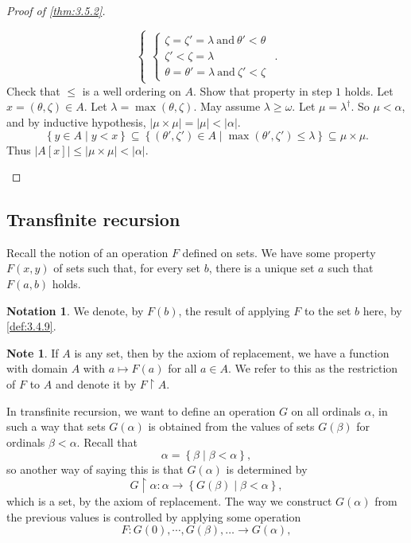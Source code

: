 \documentclass{article}
\newcommand{\rb}[1]{\left( #1 \right)}
\renewcommand{\sb}[1]{\left[ #1 \right]}
\newcommand{\cb}[1]{\left\{ #1 \right\}}
\newcommand{\abs}[1]{\left\lvert #1 \right\rvert}
\theoremstyle{definition}\newtheorem{definition}{Definition}[subsection]
\theoremstyle{definition}\newtheorem{remark1}[definition]{Remark}
\theoremstyle{definition}\newtheorem{example1}[definition]{Example}
\theoremstyle{definition}\newtheorem*{remark2}{Remark}
\theoremstyle{definition}\newtheorem*{example2}{Example}
\theoremstyle{definition}\newtheorem*{note}{Note}
\theoremstyle{definition}\newtheorem*{notation}{Notation}
\begin{document}
\begin{proof}[Proof of \ref{thm:3.5.2}]
\begin{enumerate}[leftmargin=0.5in, label=Step \arabic*.]
$$\begin{cases}
\begin{cases}
\zeta = \zeta' = \lambda \ \text{and} \ \theta' < \theta \\
\zeta' < \zeta = \lambda \\
\theta = \theta' = \lambda \ \text{and} \ \zeta' < \zeta
\end{cases}
\end{cases}. $$
Check that $ \le $ is a well ordering on $ A $. Show that property in step $ 1 $ holds. Let $ x = \rb{\theta, \zeta} \in A $. Let $ \lambda = \max\rb{\theta, \zeta} $. May assume $ \lambda \ge \omega $. Let $ \mu = \lambda^\dagger $. So $ \mu < \alpha $, and by inductive hypothesis, $ \abs{\mu \times \mu} = \abs{\mu} < \abs{\alpha} $.
$$ \cb{y \in A \mid y < x} \subseteq \cb{\rb{\theta', \zeta'} \in A \mid \max\rb{\theta', \zeta'} \le \lambda} \subseteq \mu \times \mu. $$
Thus $ \abs{A\sb{x}} \le \abs{\mu \times \mu} < \abs{\alpha} $.
\end{enumerate}
\end{proof}

\pagebreak

\subsection{Transfinite recursion}

Recall the notion of an operation $ F $ defined on sets. We have some property $ F\rb{x, y} $ of sets such that, for every set $ b $, there is a unique set $ a $ such that $ F\rb{a, b} $ holds.

\begin{notation}
We denote, by $ F\rb{b} $, the result of applying $ F $ to the set $ b $ here, by \ref{def:3.4.9}.
\end{notation}

\begin{note}
If $ A $ is any set, then by the axiom of replacement, we have a function with domain $ A $ with $ a \mapsto F\rb{a} $ for all $ a \in A $. We refer to this as
the restriction of $ F $ to $ A $ and denote it by $ F \upharpoonright A $.
\end{note}

In transfinite recursion, we want to define an operation $ G $ on all ordinals $ \alpha $, in such a way that sets $ G\rb{\alpha} $ is obtained from the values of sets $ G\rb{\beta} $ for ordinals $ \beta < \alpha $. Recall that
$$ \alpha = \cb{\beta \mid \beta < \alpha}, $$
so another way of saying this is that $ G\rb{\alpha} $ is determined by
$$ G \upharpoonright \alpha : \alpha \to \cb{G\rb{\beta} \mid \beta < \alpha}, $$
which is a set, by the axiom of replacement.
The way we construct $ G\rb{\alpha} $ from the previous values is controlled by applying some operation
$$ F : G\rb{0}, \cdots, G\rb{\beta}, \dots \to G\rb{\alpha}, $$
\end{document}
